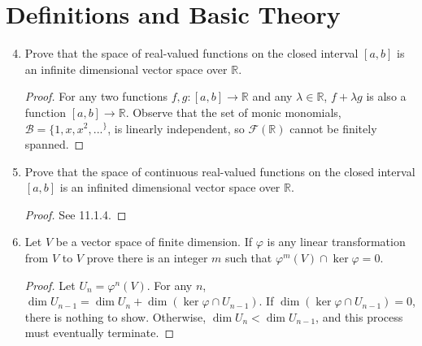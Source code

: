\documentclass{report}
\newcommand{\R}{\mathbb{R}}
\begin{document}
\section{Definitions and Basic Theory}
\begin{enumerate} 
	\setcounter{enumi}{3}
	\item Prove that the space of real-valued functions on the closed interval $[a,b]$ is an infinite dimensional vector space over $\R$.
		\begin{proof}
			For any two functions $f,g:[a,b]\to \R$ and any $\lambda\in\R$, $f+\lambda g$ is also a function $[a,b]\to \R$. 
			Observe that the set of monic monomials, $\mathcal{B}=\{1,x,x^2,...^\}$, is linearly independent, so $\mathcal{F}(\R)$ cannot be finitely spanned.
		\end{proof}
	\item Prove that the space of continuous real-valued functions on the closed interval $[a,b]$ is an infinited dimensional vector space over $\R$.
		\begin{proof}
			See 11.1.4.
		\end{proof}
	\item Let $V$ be a vector space of finite dimension. If $\varphi$ is any linear transformation from $V$ to $V$ prove there is an integer $m$ such that
		$\varphi^m(V)\cap \ker\varphi= 0$.
		\begin{proof}
			Let $U_n=\varphi^n(V)$. For any $n$, $\dim U_{n-1}=\dim U_n+ \dim(\ker\varphi\cap U_{n-1})$.
			If $\dim(\ker\varphi\cap U_{n-1}) = 0$, there is nothing to show. Otherwise, $\dim U_n<\dim U_{n-1}$, and this process must eventually terminate.
		\end{proof}
\end{enumerate}
\end{document}
